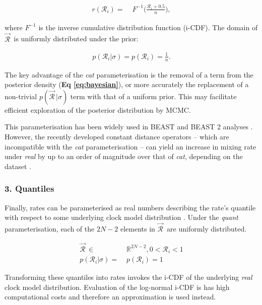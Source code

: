 \documentclass[10pt,letterpaper]{article}
\begin{document}
\begin{align}
r(\mathcal{R}_i) =& \; F^{-1}\big(\frac{\mathcal{R}_i + 0.5}{n}\big),
\end{align}

\noindent
where $F^{-1}$ is the inverse cumulative distribution function (i-CDF).
The domain of $\vec{\mathcal{R}}^{\,}$ is uniformly distributed under the prior:


\begin{align}
p(\mathcal{R}_i | \sigma) = p(\mathcal{R}_i) = \frac{1}{n}.
\end{align}



The key advantage of the \textit{cat} parameterisation is the removal of a term from the posterior density (\textbf{Eq \ref{eq:bayesian}}), or more accurately the replacement of a non-trivial $p(\vec{\mathcal{R}}^{\,} | \sigma)$ term with that of a uniform prior. 
This may facilitate efficient exploration of the posterior distribution by MCMC.




This parameterisation has been widely used in BEAST and BEAST 2 analyses \cite{drummond2006relaxed}. 
However, the recently developed constant distance operators  -- which are incompatible with the \textit{cat} parameterisation -- can yield an increase in mixing rate under \textit{real} by up to an order of magnitude over that of \textit{cat}, depending on the dataset \cite{zhang2020improving}. 






\subsubsection*{3. Quantiles}


Finally, rates can be parameterised as real numbers describing the rate's quantile with respect to some underlying clock model distribution \cite{li2012model}.
 Under the  \textit{quant} parameterisation, each of the $2N-2$ elements in $\vec{\mathcal{R}}^{\,}$ are uniformly distributed.


\begin{align}
\vec{\mathcal{R}}^{\,} \in & \; \mathbb{R}^{2N-2}, 0 < \mathcal{R}_i < 1  \\
p(\mathcal{R}_i | \sigma) = & \; p(\mathcal{R}_i) = 1
\end{align}


Transforming these quantiles into rates invokes the i-CDF of the underlying \textit{real} clock model distribution.
Evaluation of the log-normal i-CDF is has high computational costs and
therefore an approximation is used instead.
\end{document}
